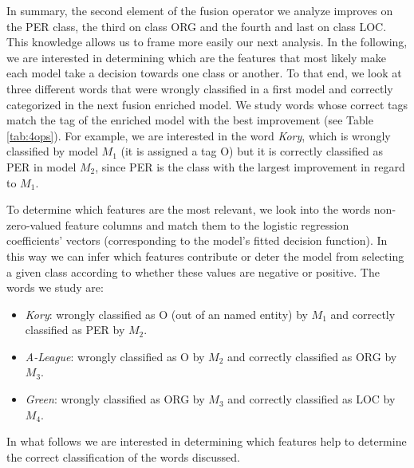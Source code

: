 In summary, the second element of the fusion operator we analyze improves on the PER class, the third on class ORG and the fourth and last on class LOC. This knowledge allows us to frame more easily our next analysis. In the following, we are interested in determining which are the features that most likely make each model take  a decision towards one class or another. To that end, we look at three different words that were wrongly classified in a first model and correctly categorized in the next fusion enriched model. We study words whose correct tags match the tag of the enriched model with the best improvement (see Table \ref{tab:4ops}). For example, we are interested in the word \textit{Kory}, which is wrongly classified by model $M_1$ (it is assigned a tag O) but it is correctly classified as PER in model $M_2$, since PER is the class with the largest improvement in regard to $M_1$.

To determine which features are the most relevant, we look into the words non-zero-valued feature columns and match them to the logistic regression  coefficients' vectors (corresponding to the model's fitted decision function). In this way we can infer which features contribute or deter  the model from selecting a given class according to whether these values are negative or positive. The words we study are:
\begin{itemize}
\item \textit{Kory}: wrongly classified as O (out of an named entity) by $M_1$ and correctly classified as PER by $M_2$.
\item \textit{A-League}: wrongly classified as O by $M_2$ and correctly classified as ORG by $M_3$.
\item \textit{Green}: wrongly classified as  ORG by $M_3$ and correctly classified as LOC by $M_4$.
\end{itemize}

In what follows we are interested in determining which features help to determine the correct classification of the words discussed.
                                                                                                                         
